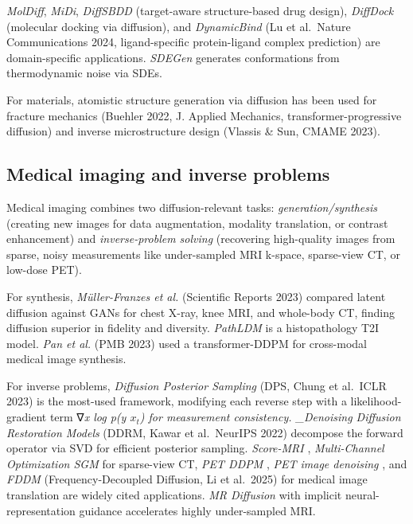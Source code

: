 \documentclass{article}
\begin{document}
\emph{MolDiff}, \emph{MiDi}, \emph{DiffSBDD} (target-aware structure-based drug design), \emph{DiffDock} (molecular docking via diffusion), and \emph{DynamicBind} (Lu et al.~Nature Communications 2024, ligand-specific protein-ligand complex prediction) are domain-specific applications. \emph{SDEGen} \citep{zhang2023addingconditionalc} generates conformations from thermodynamic noise via SDEs.

For materials, atomistic structure generation via diffusion has been used for fracture mechanics (Buehler 2022, J. Applied Mechanics, transformer-progressive diffusion) and inverse microstructure design (Vlassis \& Sun, CMAME 2023).

\subsection{Medical imaging and inverse problems}\label{medical-imaging-and-inverse-problems}

Medical imaging combines two diffusion-relevant tasks: \emph{generation/synthesis} (creating new images for data augmentation, modality translation, or contrast enhancement) and \emph{inverse-problem solving} (recovering high-quality images from sparse, noisy measurements like under-sampled MRI k-space, sparse-view CT, or low-dose PET).

For synthesis, \emph{Müller-Franzes et al.} (Scientific Reports 2023) compared latent diffusion against GANs for chest X-ray, knee MRI, and whole-body CT, finding diffusion superior in fidelity and diversity. \emph{PathLDM} \citep{yellapragada20242024} is a histopathology T2I model. \emph{Pan et al.} (PMB 2023) used a transformer-DDPM for cross-modal medical image synthesis.

For inverse problems, \emph{Diffusion Posterior Sampling} (DPS, Chung et al.~ICLR 2023) is the most-used framework, modifying each reverse step with a likelihood-gradient term ∇\emph{x log p(y \textbar{} \(x_t\)) for measurement consistency. \_Denoising Diffusion Restoration Models} (DDRM, Kawar et al.~NeurIPS 2022) decompose the forward operator via SVD for efficient posterior sampling. \emph{Score-MRI} \citep{chung2023diffusionposterior}, \emph{Multi-Channel Optimization SGM} \citep{wu20242024} for sparse-view CT, \emph{PET DDPM} \citep{singh20242024}, \emph{PET image denoising} \citep{gong20232023}, and \emph{FDDM} (Frequency-Decoupled Diffusion, Li et al.~2025) for medical image translation are widely cited applications. \emph{MR Diffusion} with implicit neural-representation guidance \citep{chu20242024} accelerates highly under-sampled MRI.
\end{document}
